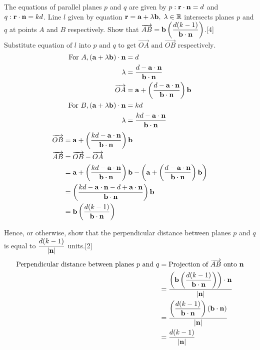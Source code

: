 \documentclass[12pt, a4 paper]{article}
\begin{document}
\begin{outline}[enumerate]
					\1 The equations of parallel planes $p$ and $q$ are given by $p:{\bf{r}} \cdot {\bf{n}} = d$ and $q:{\bf{r}} \cdot {\bf{n}} = kd$. Line $l$ given by equation ${\bf{r}} = {\bf{a}} + \lambda {\bf{b}},\;\lambda  \in \mathbb{R}$ intersects planes $p$ and $q$ at points $A$ and $B$ respectively.
					\2 Show that $\overrightarrow {AB}  = {\bf{b}}\left( {\dfrac{{d(k - 1)}}{{{\bf{b}} \cdot {\bf{n}}}}} \right)$.\hfill[4]
					\color{blue}\\
					${\textrm{Substitute equation of }}l{\textrm{ into }}p{\textrm{ and }}q{\textrm{ to get }}\overrightarrow {OA} {\textrm{ and }}\overrightarrow {OB} {\textrm{ respectively}}{\textrm{.}}$
					\begin{align*}
						{\textrm{For }}A,({\bf{a}} + \lambda {\bf{b}}) \cdot {\bf{n}} & = d \\\lambda  &= \frac{{d - {\bf{a}} \cdot {\bf{n}}}}{{{\bf{b}} \cdot {\bf{n}}}}\\\overrightarrow {OA}  &= {\bf{a}} + \left( {\frac{{d - {\bf{a}} \cdot {\bf{n}}}}{{{\bf{b}} \cdot {\bf{n}}}}} \right){\bf{b}}\\{\textrm{For }}B,({\bf{a}} + \lambda {\bf{b}}) \cdot {\bf{n}} &= kd\\\lambda &= \frac{{kd - {\bf{a}} \cdot {\bf{n}}}}{{{\bf{b}} \cdot {\bf{n}}}}
					\end{align*}
					\begin{align*}
						\overrightarrow {OB}  &= {\bf{a}} + \left( {\frac{{kd - {\bf{a}} \cdot {\bf{n}}}}{{{\bf{b}} \cdot {\bf{n}}}}} \right){\bf{b}}
						  \\\overrightarrow {AB}  &= \overrightarrow {OB}  - \overrightarrow {OA} \\ &= {\bf{a}} + \left( {\frac{{kd - {\bf{a}} \cdot {\bf{n}}}}{{{\bf{b}} \cdot {\bf{n}}}}} \right){\bf{b}} - \left( {{\bf{a}} + \left( {\frac{{d - {\bf{a}} \cdot {\bf{n}}}}{{{\bf{b}} \cdot {\bf{n}}}}} \right){\bf{b}}} \right)\\ &= \left( {\frac{{kd - {\bf{a}} \cdot {\bf{n}} - d + {\bf{a}} \cdot {\bf{n}}}}{{{\bf{b}} \cdot {\bf{n}}}}} \right){\bf{b}}\\ &= {\bf{b}}\left( {\frac{{d(k - 1)}}{{{\bf{b}} \cdot {\bf{n}}}}} \right)
					\end{align*}
					\color{black}

					\2 Hence, or otherwise, show that the perpendicular distance between planes $p$ and $q$ is equal to $\dfrac{{d(k - 1)}}{{\left| {\bf{n}} \right|}}$ units.\hfill[2]
					\color{blue}
					\begin{align*}
						{\textrm{Perpendicular distance between planes }}p{\textrm{ and }}q & = {\textrm{Projection of }}\overrightarrow {AB} {\textrm{ onto }}{\bf{n}} \\ &= \dfrac{{\left( {{\bf{b}}\left( {\dfrac{{d(k - 1)}}{{{\bf{b}} \cdot {\bf{n}}}}} \right)} \right) \cdot {\bf{n}}}}{{\left| {\bf{n}} \right|}}\\ &= \dfrac{{\left( {\dfrac{{d(k - 1)}}{{{\bf{b}} \cdot {\bf{n}}}}} \right)\left( {{\bf{b}} \cdot {\bf{n}}} \right)}}{{\left| {\bf{n}} \right|}}\\ &= \dfrac{{d(k - 1)}}{{\left| {\bf{n}} \right|}}
					\end{align*}


\end{outline}
\end{document}
